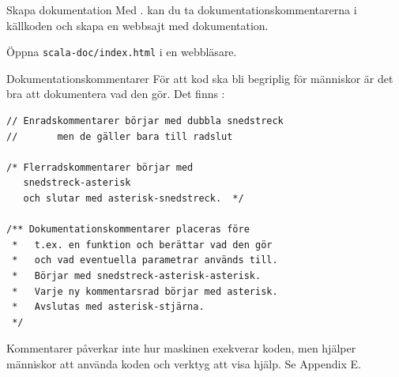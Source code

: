 \begin{Slide}{Skapa dokumentation}
Med  . kan du ta dokumentationskommentarerna i källkoden och skapa en webbsajt med dokumentation.

\vspace{2em}

\vspace{1em} Öppna \texttt{scala-doc/index.html} i en webbläsare.
\end{Slide}
  
  

\begin{Slide}{Dokumentationskommentarer}\footnotesize
För att kod ska bli begriplig för människor är det bra att dokumentera vad den gör. Det finns :
\begin{lstlisting}
// Enradskommentarer börjar med dubbla snedstreck
//       men de gäller bara till radslut

/* Flerradskommentarer börjar med
   snedstreck-asterisk
   och slutar med asterisk-snedstreck.  */

/** Dokumentationskommentarer placeras före
 *   t.ex. en funktion och berättar vad den gör
 *   och vad eventuella parametrar används till.
 *   Börjar med snedstreck-asterisk-asterisk.
 *   Varje ny kommentarsrad börjar med asterisk.
 *   Avslutas med asterisk-stjärna.
 */
\end{lstlisting}
Kommentarer påverkar inte hur maskinen exekverar koden, men hjälper människor att använda koden och verktyg att visa hjälp. Se Appendix E.
\end{Slide}

